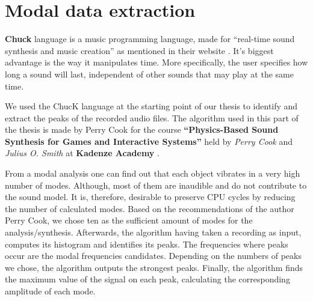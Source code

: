 
\section{Modal data extraction}\label{sec:chuck}
\textbf{Chuck} language is a music programming language, made for ``real-time sound synthesis and music creation'' as mentioned in their website \cite{bib:chuck}. It's biggest advantage is the way it manipulates time. More specifically, the user specifies how long a sound will last, independent of other sounds that may play at the same time.

We used the ChucK language at the starting point of our thesis to identify and extract the peaks of the recorded audio files. The algorithm used in this part of the thesis is made by Perry Cook for the course \textbf{``Physics-Based Sound Synthesis for Games and Interactive Systems''} held by \textit{Perry Cook} and \textit{Julius O. Smith} at \textbf{Kadenze Academy} \cite{bib:physicsbasedcourse}.

From a modal analysis one can find out that each object vibrates in a very high number of modes. Although, most of them are inaudible and do not contribute to the sound model. It is, therefore, desirable to preserve CPU cycles by reducing the number of calculated modes. Based on the recommendations of the author Perry Cook, we chose ten as the sufficient amount of modes for the analysis/synthesis.  Afterwards, the algorithm having taken a recording as input, computes its histogram and identifies its peaks. The frequencies where peaks occur are the modal frequencies candidates. Depending on the numbers of peaks we chose, the algorithm outputs the strongest peaks. Finally, the algorithm finds the maximum value of the signal on each peak, calculating the corresponding amplitude of each mode.

